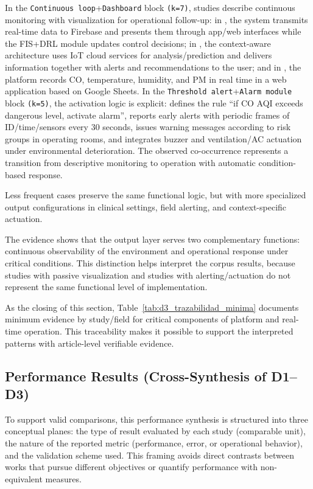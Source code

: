 In the \texttt{Continuous loop}+\texttt{Dashboard} block \texttt{(k=7)}, studies describe continuous monitoring with visualization for operational follow-up: in \cite{A114}, the system transmits real-time data to Firebase and presents them through app/web interfaces while the FIS+DRL module updates control decisions; in \cite{A136}, the context-aware architecture uses IoT cloud services for analysis/prediction and delivers information together with alerts and recommendations to the user; and in \cite{A167}, the platform records CO, temperature, humidity, and PM in real time in a web application based on Google Sheets. In the \texttt{Threshold alert}+\texttt{Alarm module} block \texttt{(k=5)}, the activation logic is explicit: \cite{A167} defines the rule “if CO AQI exceeds dangerous level, activate alarm”, \cite{A165} reports early alerts with periodic frames of ID/time/sensors every 30 seconds, \cite{A142} issues warning messages according to risk groups in operating rooms, and \cite{A114} integrates buzzer and ventilation/AC actuation under environmental deterioration. The observed co-occurrence represents a transition from descriptive monitoring to operation with automatic condition-based response.

Less frequent cases preserve the same functional logic, but with more specialized output configurations in clinical settings, field alerting, and context-specific actuation.

The evidence shows that the output layer serves two complementary functions: continuous observability of the environment and operational response under critical conditions. This distinction helps interpret the corpus results, because studies with passive visualization and studies with alerting/actuation do not represent the same functional level of implementation.



As the closing of this section, Table~\ref{tab:d3_trazabilidad_minima} documents minimum evidence by study/field for critical components of platform and real-time operation. This traceability makes it possible to support the interpreted patterns with article-level verifiable evidence.

\subsection{Performance Results (Cross-Synthesis of D1--D3)}
To support valid comparisons, this performance synthesis is structured into three conceptual planes: the type of result evaluated by each study (comparable unit), the nature of the reported metric (performance, error, or operational behavior), and the validation scheme used. This framing avoids direct contrasts between works that pursue different objectives or quantify performance with non-equivalent measures.

